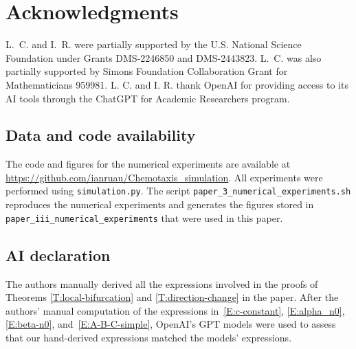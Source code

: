 \documentclass[11pt]{article} %
\theoremstyle{remark}
\theoremstyle{remark}
\numberwithin{equation}{section}
\numberwithin{figure}{section}
\numberwithin{table}{section}
\begin{document}
\section*{Acknowledgments}
 L.~C. and I.~R. were partially
supported by the U.S. National Science Foundation under Grants DMS-2246850 and
DMS-2443823. L.~C. was also partially supported by Simons Foundation
Collaboration Grant for Mathematicians 959981. L. C. and I. R. thank OpenAI for
providing access to its AI tools through the ChatGPT for Academic Researchers
program.

\subsection*{Data and code availability}
The code and figures for the numerical experiments are available at
\url{https://github.com/ianruau/Chemotaxis_simulation}. All experiments were
performed using \texttt{simulation.py}. The script
\texttt{paper\_3\_numerical\_experiments.sh} reproduces the numerical
experiments and generates the figures stored in
\texttt{paper\_iii\_numerical\_experiments} that were used in this paper.

\subsection*{AI declaration}
The authors manually derived all the expressions involved in  the proofs of
Theorems  \ref{T:local-bifurcation} and \ref{T:direction-change}  in the paper.
After the authors' manual computation of the expressions
in~\eqref{E:c-constant}, \eqref{E:alpha_n0}, \eqref{E:beta-n0},
and~\eqref{E:A-B-C-simple}, OpenAI's GPT models were used to assess that our
hand-derived expressions matched the models' expressions.




{}

\end{document}
